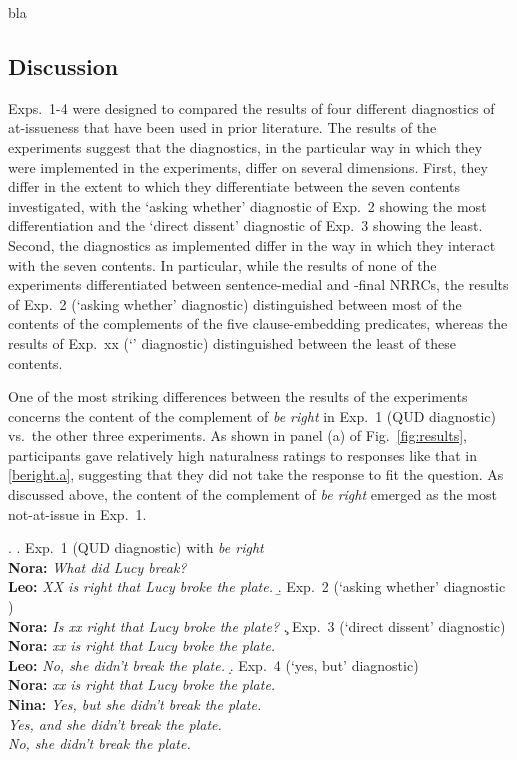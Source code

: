 \documentclass[times,linguex,xcolor]{glossa}
\begin{document}
  \newpage

  bla

  \newpage

  \subsection{Discussion}

  Exps.~1-4 were designed to compared the results of four different diagnostics of at-issueness that have been used in prior literature. The results of the experiments suggest that the diagnostics, in the particular way in which they were implemented in the experiments, differ on several dimensions. First, they differ in the extent to which they differentiate between the seven contents investigated, with the `asking whether' diagnostic of Exp.~2 showing the most differentiation and the `direct dissent' diagnostic of Exp.~3 showing the least. Second, the diagnostics as implemented differ in the way in which they interact with the seven contents. In particular, while the results of none of the experiments differentiated between sentence-medial and -final NRRCs, the results of Exp.~2 (`asking whether' diagnostic) distinguished between most of the contents of the complements of the five clause-embedding predicates, whereas the results of Exp.~xx (`' diagnostic) distinguished between the least of these contents.

  One of the most striking differences between the results of the experiments concerns the content of the complement of \emph{be right} in Exp.~1 (QUD diagnostic) vs.\ the other three experiments. As shown in panel (a) of Fig.~\ref{fig:results}, participants gave relatively high naturalness ratings to responses like that in \ref{beright.a}, suggesting that they did not take the response to fit the question. As discussed above, the content of the complement of \emph{be right} emerged as the most not-at-issue in Exp.~1. 

  \ex.
  \a.\label{beright.a}  Exp.~1 (QUD diagnostic) with \emph{be right}
  \\ {\bf Nora:} \emph{What did Lucy break?}
  \\ {\bf Leo:} \emph{XX is right that Lucy broke the plate.}
  \b.\label{beright.b} Exp.~2 (`asking whether' diagnostic )
  \\ {\bf Nora:} \emph{Is xx right that Lucy broke the plate?}
  \c.\label{beright.c} Exp.~3 (`direct dissent' diagnostic)
  \\ {\bf Nora:} \emph{xx is right that Lucy broke the plate.}
  \\ {\bf Leo:} \emph{No, she didn't break the plate.}
  \d.\label{beright.d} Exp.~4 (`yes, but' diagnostic)
  \\ {\bf Nora:} \emph{xx is right that Lucy broke the plate.}
  \\ {\bf Nina:} \emph{Yes, but she didn't break the plate.}
  \\ \hspace*{1cm} \emph{Yes, and she didn't break the plate.}
  \\ \hspace*{1cm} \emph{No, she didn't break the plate.}
\end{document}
